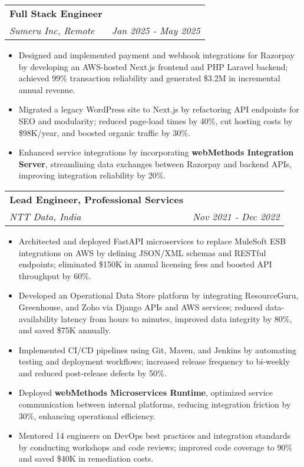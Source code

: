 \documentclass[letterpaper,11pt]{article}
\makeatletter
\newcommand{\resumeItem}[1]{
  \item\small{
    {#1 \vspace{-1pt}}
  }
}
\newcommand{\resumeSubheading}[4]{
  \vspace{-2pt}\item
    \begin{tabular*}{1.0\textwidth}[t]{l@{\extracolsep{\fill}}r}
      \textbf{\large#1} & \textbf{\small #2} \\
      \textit{\large#3} & \textit{\small #4} \\
      
    \end{tabular*}\vspace{-7pt}
}
\newcommand{\resumeItemListStart}{\begin{itemize}[leftmargin=0.1in]}
\newcommand{\resumeItemListEnd}{\end{itemize}\vspace{-5pt}}
\makeatother
\begin{document}
    \resumeSubheading
      {Full Stack Engineer}{} 
      {Sumeru Inc, Remote}{Jan 2025 - May 2025}
      \resumeItemListStart
            \resumeItem{\normalsize{Designed and implemented payment and webhook integrations for Razorpay by developing an AWS-hosted Next.js frontend and PHP Laravel backend; achieved 99\% transaction reliability and generated \$3.2M in incremental annual revenue.}}
            \resumeItem{\normalsize{Migrated a legacy WordPress site to Next.js by refactoring API endpoints for SEO and modularity; reduced page-load times by 40\%, cut hosting costs by \$98K/year, and boosted organic traffic by 30\%.}}  
            \resumeItem{\normalsize{Enhanced service integrations by incorporating \textbf{webMethods Integration Server}, streamlining data exchanges between Razorpay and backend APIs, improving integration reliability by 20\%.}}  
      \resumeItemListEnd  

    \resumeSubheading
      {Lead Engineer, Professional Services}{} 
      {NTT Data, India}{Nov 2021 - Dec 2022}
      \resumeItemListStart
            \resumeItem{\normalsize{Architected and deployed FastAPI microservices to replace MuleSoft ESB integrations on AWS by defining JSON/XML schemas and RESTful endpoints; eliminated \$150K in annual licensing fees and boosted API throughput by 60\%.}}
            \resumeItem{\normalsize{Developed an Operational Data Store platform by integrating ResourceGuru, Greenhouse, and Zoho via Django APIs and AWS services; reduced data-availability latency from hours to minutes, improved data integrity by 80\%, and saved \$75K annually.}}  
            \resumeItem{\normalsize{Implemented CI/CD pipelines using Git, Maven, and Jenkins by automating testing and deployment workflows; increased release frequency to bi-weekly and reduced post-release defects by 50\%.}}
            \resumeItem{\normalsize{Deployed \textbf{webMethods Microservices Runtime}, optimized service communication between internal platforms, reducing integration friction by 30\%, enhancing operational efficiency.}}
            \resumeItem{\normalsize{Mentored 14 engineers on DevOps best practices and integration standards by conducting workshops and code reviews; improved code coverage to 90\% and saved \$40K in remediation costs.}}  
      \resumeItemListEnd  
\end{document}
